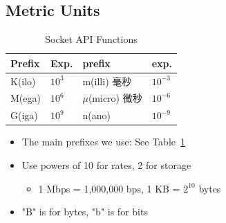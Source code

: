 \documentclass[12pt]{ctexart}   %
\begin{document}
	\subsection{Metric Units}
	
		\begin{table}[h] 
		\begin{center}
		\begin{tabular}{p{2cm} | p{1cm} | p{3cm} | p{2cm}} 
		\hline
		\hline
		Prefix & Exp. & prefix & exp. \\
		\hline 
		K(ilo) & $10^3$ & m(illi) 毫秒 & $10^{-3}$\\
		\hline
		 M(ega) & $10^6$ & $\mu$(micro) 微秒 & $10^{-6}$\\
		\hline
		G(iga) & $10^9$ & n(ano) & $10^{-9}$\\
		\hline
		\hline
		\end{tabular}
		\end{center}
		\caption{Socket API Functions} 
		\label{table:2-1-1}
		\end{table}
		
	\begin{itemize}
		\item The main prefixes we use:  See Table~\ref{table:2-1-1}
		\item Use powers of 10 for rates, 2 for storage
		\begin{itemize}
			\item 1 Mbps = 1,000,000 bps, 1 KB = $2^{10}$ bytes
		\end{itemize}
		
		\item "B" is for bytes, "b" is for bits
	\end{itemize}
\end{document}
